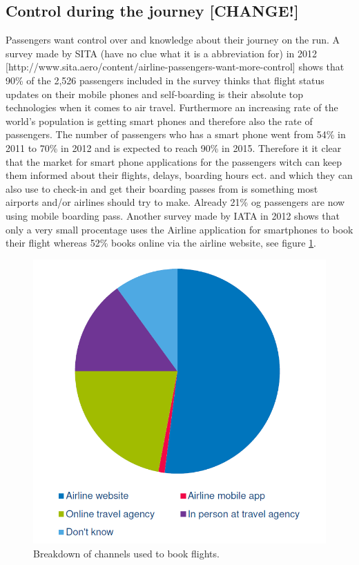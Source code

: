 \subsection{Control during the journey [CHANGE!]}
Passengers want control over and knowledge about their journey on the run. A survey made by SITA (have no clue what it is a abbreviation for) in 2012 [http://www.sita.aero/content/airline-passengers-want-more-control] shows that 90\% of the 2,526 passengers included in the survey thinks that flight status updates on their mobile phones and self-boarding is their absolute top technologies when it comes to air travel. Furthermore an increasing rate of the world's population is getting smart phones and therefore also the rate of passengers. The number of passengers who has a smart phone went from 54\% in 2011 to 70\% in 2012 and is expected to reach 90\% in 2015. Therefore it it clear that the market for smart phone applications for the passengers witch can keep them informed about their flights, delays, boarding hours ect. and which they can also use to check-in and get their boarding passes from is something most airports and/or airlines should try to make. Already 21\% og passengers are now using mobile boarding pass.
Another survey made by IATA in 2012 shows that only a very small procentage uses the Airline application for smartphones to book their flight whereas 52\% books online via the airline website, see figure \ref{channes used to book}.

\begin{figure}
\centering
\includegraphics{Grafik/channes_used_to_book}
\caption{Breakdown of channels used to book flights.}
\label{channes used to book}
\end{figure}


